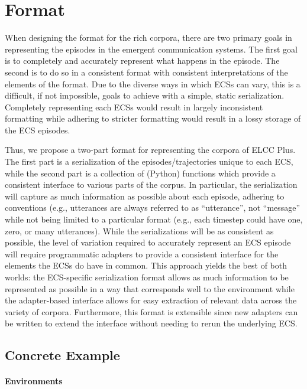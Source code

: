 \section{Format}

When designing the format for the rich corpora, there are two primary goals in representing the episodes in the emergent communication systems.
The first goal is to completely and accurately represent what happens in the episode.
The second is to do so in a consistent format with consistent interpretations of the elements of the format.
Due to the diverse ways in which ECSs can vary, this is a difficult, if not impossible, goals to achieve with a simple, static serialization.
Completely representing each ECSs would result in largely inconsistent formatting while adhering to stricter formatting would result in a lossy storage of the ECS episodes.

Thus, we propose a two-part format for representing the corpora of ELCC Plus.
The first part is a serialization of the episodes/trajectories unique to each ECS, while the second part is a collection of (Python) functions which provide a consistent interface to various parts of the corpus.
In particular, the serialization will capture as much information as possible about each episode, adhering to conventions (e.g., utterances are always referred to as ``utterance'', not ``message'' while not being limited to a particular format (e.g., each timestep could have one, zero, or many utterances).
While the serializations will be as consistent as possible, the level of variation required to accurately represent an ECS episode will require programmatic adapters to provide a consistent interface for the elements the ECSs do have in common.
This approach yields the best of both worlds:
  the ECS-specific serialization format allows as much information to be represented as possible in a way that corresponds well to the environment while the adapter-based interface allows for easy extraction of relevant data across the variety of corpora.
Furthermore, this format is extensible since new adapters can be written to extend the interface without needing to rerun the underlying ECS\@.


\subsection{Concrete Example}

\paragraph{Environments}

